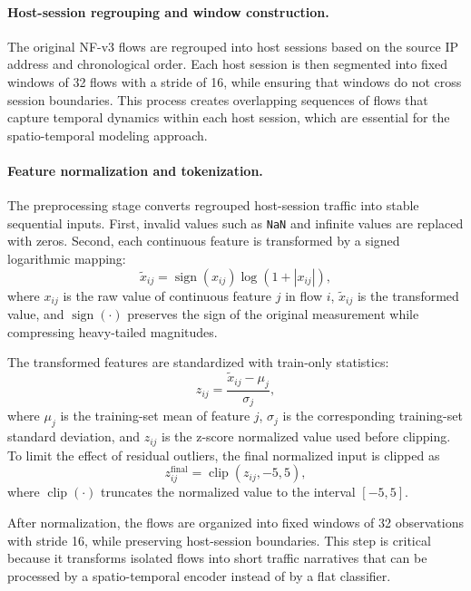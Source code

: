 \documentclass[12pt, a4paper]{report}
\begin{document}
\paragraph{Host-session regrouping and window construction.}
The original NF-v3 flows are regrouped into host sessions based on the source IP address and chronological order. Each host session is then segmented into fixed windows of 32 flows with a stride of 16, while ensuring that windows do not cross session boundaries. This process creates overlapping sequences of flows that capture temporal dynamics within each host session, which are essential for the spatio-temporal modeling approach.
\paragraph{Feature normalization and tokenization.}
The preprocessing stage converts regrouped host-session traffic into stable sequential inputs. First, invalid values such as \texttt{NaN} and infinite values are replaced with zeros. Second, each continuous feature is transformed by a signed logarithmic mapping:
\begin{equation}
\tilde{x}_{ij} = \operatorname{sign}(x_{ij})\log\left(1 + |x_{ij}|\right),
\end{equation}
where $x_{ij}$ is the raw value of continuous feature $j$ in flow $i$, $\tilde{x}_{ij}$ is the transformed value, and $\operatorname{sign}(\cdot)$ preserves the sign of the original measurement while compressing heavy-tailed magnitudes.

The transformed features are standardized with train-only statistics:
\begin{equation}
z_{ij} = \frac{\tilde{x}_{ij} - \mu_j}{\sigma_j},
\end{equation}
where $\mu_j$ is the training-set mean of feature $j$, $\sigma_j$ is the corresponding training-set standard deviation, and $z_{ij}$ is the z-score normalized value used before clipping. To limit the effect of residual outliers, the final normalized input is clipped as
\begin{equation}
z_{ij}^{\mathrm{final}} = \operatorname{clip}(z_{ij}, -5, 5),
\end{equation}
where $\operatorname{clip}(\cdot)$ truncates the normalized value to the interval $[-5,5]$.

After normalization, the flows are organized into fixed windows of 32 observations with stride 16, while preserving host-session boundaries. This step is critical because it transforms isolated flows into short traffic narratives that can be processed by a spatio-temporal encoder instead of by a flat classifier.
\end{document}
